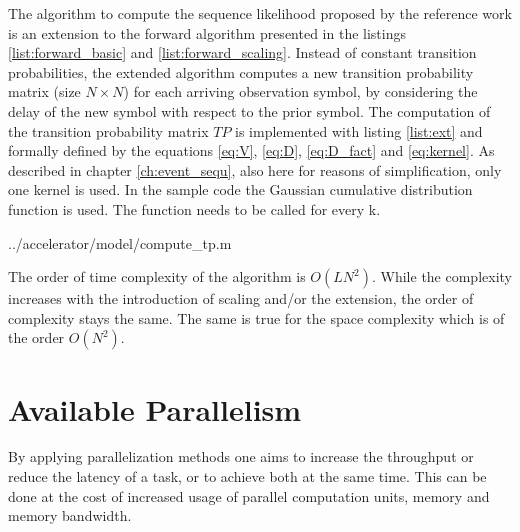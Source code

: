 \documentclass[mscthesis]{usiinfthesis}
\begin{document}
The algorithm to compute the sequence likelihood proposed by the reference work
is an extension to the forward algorithm presented in the listings
\ref{list:forward_basic} and \ref{list:forward_scaling}. Instead of constant
transition probabilities, the extended algorithm computes a new transition
probability matrix (size $ N \times N$) for each arriving observation symbol,
by considering the delay of the new symbol with respect to the prior symbol.
The computation of the transition probability matrix $ TP $ is implemented with
listing \ref{list:ext} and formally defined by the equations \ref{eq:V},
\ref{eq:D}, \ref{eq:D_fact} and \ref{eq:kernel}. As described in chapter
\ref{ch:event_sequ}, also here for reasons of simplification, only one kernel
is used. In the sample code the Gaussian cumulative distribution function is
used. The function needs to be called for every k.


    {../accelerator/model/compute_tp.m}

The order of time complexity of the algorithm is $O(LN^2)$. While the
complexity increases with the introduction of scaling and/or the extension, the
order of complexity stays the same. The same is true for the space complexity
which is of the order $O(N^2)$.

\section{Available Parallelism}
\label{ch:analysis_parallel}

By applying parallelization methods one aims to increase the throughput or
reduce the latency of a task, or to achieve both at the same time. This can be
done at the cost of increased usage of parallel computation units, memory and
memory bandwidth.
\end{document}
